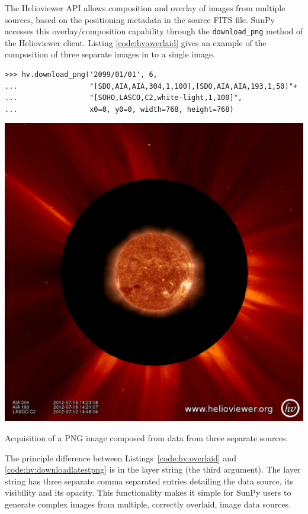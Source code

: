 The Helioviewer API allows composition and overlay of images from
multiple sources, based on the positioning metadata in the source FITS
file.  SunPy accesses this overlay/composition capability through the
\texttt{download\_png} method of the Helioviewer client.  Listing
\ref{code:hv:overlaid} gives an example of the composition of three
separate images in to a single image.

\begin{listing}[H]
\begin{verbatim}
>>> hv.download_png('2099/01/01', 6,
...                 "[SDO,AIA,AIA,304,1,100],[SDO,AIA,AIA,193,1,50]"+
...                 "[SOHO,LASCO,C2,white-light,1,100]",
...                 x0=0, y0=0, width=768, height=768)
\end{verbatim}
\begin{center}
\includegraphics[width=0.8\columnwidth]{helioviewer_overlay_example}
\end{center}
\caption{Acquisition of a PNG image composed from data from three
  separate sources.}
\label{code:hv:overlaid}
\end{listing}

The principle difference between Listings~\ref{code:hv:overlaid} and 
\ref{code:hv:downloadlatestpng} is in the layer string (the third
argument).  The layer string has three separate comma separated
entries detailing the data source, its visibility and its opacity.
This functionality makes it simple for SunPy users to generate complex
images from multiple, correctly overlaid, image data sources.

